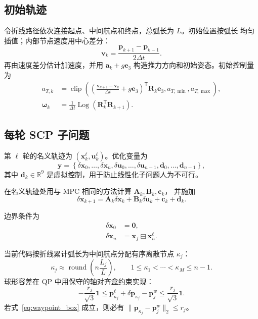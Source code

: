 \documentclass[UTF8,a4paper,11pt]{ctexart}
\newcommand{\R}{\mathbb{R}}
\newcommand{\Log}{\operatorname{Log}}
\newcommand{\clip}{\operatorname{clip}}
\begin{document}
\subsection{初始轨迹}

令折线路径依次连接起点、中间航点和终点，总弧长为 $L$。初始位置按弧长
均匀插值；内部节点速度用中心差分：
\begin{equation}
  \bm v_k=\frac{\bm p_{k+1}-\bm p_{k-1}}{2\Delta t}.
\end{equation}
再由速度差分估计加速度，并用
$\bm a_k+g\bm e_3$ 构造推力方向和初始姿态。初始控制量为
\begin{align}
  a_{T,k}&=\clip\left(
  \left(\frac{\bm v_{k+1}-\bm v_k}{\Delta t}+g\bm e_3\right)^\mathsf T
  \bm R_k\bm e_3,
  a_{T,\min},a_{T,\max}\right),\\
  \bm\omega_k&=\frac1{\Delta t}
  \Log(\bm R_k^\mathsf T\bm R_{k+1}).
\end{align}

\subsection{每轮 SCP 子问题}

第 $\ell$ 轮的名义轨迹为
$(\bm x_k^\ell,\bm u_k^\ell)$。优化变量为
\begin{equation}
  \bm y=\left\{
  \delta\bm x_0,\ldots,\delta\bm x_n,
  \delta\bm u_0,\ldots,\delta\bm u_{n-1},
  \bm d_0,\ldots,\bm d_{n-1}
  \right\},
\end{equation}
其中 $\bm d_k\in\R^9$ 是虚拟控制，用于防止线性化子问题人为不可行。

在名义轨迹处用与 MPC 相同的方法计算 $\bm A_k,\bm B_k,\bm c_k$，
并施加
\begin{equation}
  \delta\bm x_{k+1}
  =\bm A_k\delta\bm x_k
  +\bm B_k\delta\bm u_k+\bm c_k+\bm d_k.
  \label{eq:scp_dynamics}
\end{equation}

边界条件为
\begin{align}
  \delta\bm x_0&=\bm0,\\
  \delta\bm x_n&=\bm x_f\boxminus\bm x_n^\ell.
\end{align}

当前代码按折线累计弧长为中间航点分配有序离散节点 $\kappa_j$：
\begin{equation}
  \kappa_j\approx
  \operatorname{round}\left(n\frac{L_j}{L}\right),
  \qquad 1\leq\kappa_1<\cdots<\kappa_M\leq n-1.
\end{equation}
球形容差在 QP 中用保守的轴对齐盒约束实现：
\begin{equation}
  -\frac{r_j}{\sqrt3}\bm1
  \leq
  \bm p_{\kappa_j}^\ell+\delta\bm p_{\kappa_j}-\bm p_j^w
  \leq
  \frac{r_j}{\sqrt3}\bm1.
  \label{eq:waypoint_box}
\end{equation}
若式~\eqref{eq:waypoint_box} 成立，则必有
$\lVert\bm p_{\kappa_j}-\bm p_j^w\rVert_2\leq r_j$。
\end{document}
